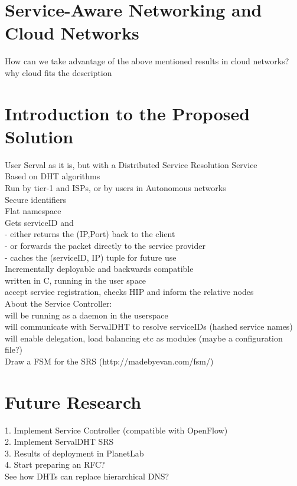 \documentclass[12pt,a4paper,oneside]{article}
\begin{document}
\section{Service-Aware Networking and Cloud Networks}
How can we take advantage of the above mentioned results in cloud networks?
why cloud fits the description


\newpage
\section{Introduction to the Proposed Solution}
User Serval as it is, but with a Distributed Service Resolution Service
\\Based on DHT algorithms
\\Run by tier-1 and ISPs, or by users in Autonomous networks
\\Secure identifiers
\\Flat namespace
\\Gets serviceID and
\\- either returns the (IP,Port) back to the client
\\- or forwards the packet directly to the service provider
\\- caches the (serviceID, IP) tuple for future use
\\Incrementally deployable and backwards compatible
\\written in C, running in the user space
\\accept service registration, checks HIP and inform the relative nodes
\\About the Service Controller:
\\will be running as a daemon in the userspace
\\will communicate with ServalDHT to resolve serviceIDs (hashed service names)
\\will enable delegation, load balancing etc as modules (maybe a configuration file?)
\\Draw a FSM for the SRS  (http://madebyevan.com/fsm/)


\newpage
\section{Future Research}
1. Implement Service Controller (compatible with OpenFlow)
\\2. Implement ServalDHT SRS
\\3. Results of deployment in PlanetLab
\\4. Start preparing an RFC?
\\See how DHTs can replace hierarchical DNS?
\end{document}
